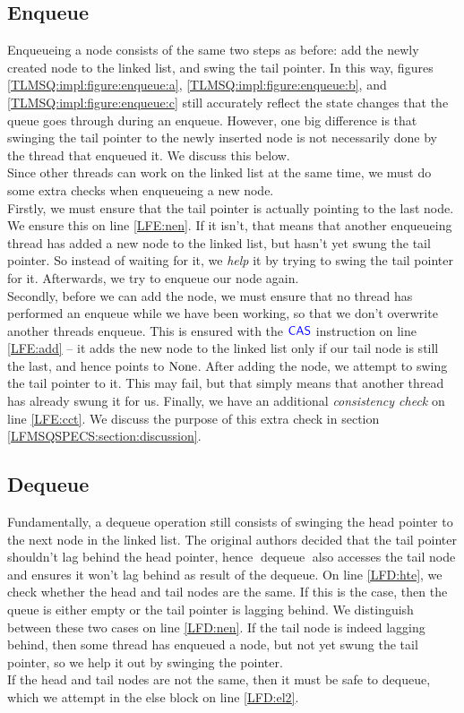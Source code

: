 \documentclass[a4paper, 10pt]{report}
\theoremstyle{definition}
\newcommand{\dequeue}{\operatorname{dequeue}}
\begin{document}
\subsection{Enqueue}
Enqueueing a node consists of the same two steps as before: add the newly created node to the linked list, and swing the tail pointer. In this way, figures \ref{TLMSQ:impl:figure:enqueue:a}, \ref{TLMSQ:impl:figure:enqueue:b}, and \ref{TLMSQ:impl:figure:enqueue:c} still accurately reflect the state changes that the queue goes through during an enqueue. However, one big difference is that swinging the tail pointer to the newly inserted node is not necessarily done by the thread that enqueued it. We discuss this below.\\
Since other threads can work on the linked list at the same time, we must do some extra checks when enqueueing a new node.\\
Firstly, we must ensure that the tail pointer is actually pointing to the last node. We ensure this on line \ref{LFE:nen}. If it isn't, that means that another enqueueing thread has added a new node to the linked list, but hasn't yet swung the tail pointer. So instead of waiting for it, we \textit{help} it by trying to swing the tail pointer for it. Afterwards, we try to enqueue our node again.\\
Secondly, before we can add the node, we must ensure that no thread has performed an enqueue while we have been working, so that we don't overwrite another threads enqueue. This is ensured with the $\textsf{\color{blue} CAS}$ instruction on line \ref{LFE:add} -- it adds the new node to the linked list only if our tail node is still the last, and hence points to $\operatorname{None}$. After adding the node, we attempt to swing the tail pointer to it. This may fail, but that simply means that another thread has already swung it for us.
Finally, we have an additional \textit{consistency check} on line \ref{LFE:cct}. We discuss the purpose of this extra check in section \ref{LFMSQSPECS:section:discussion}.

\subsection{Dequeue}
Fundamentally, a dequeue operation still consists of swinging the head pointer to the next node in the linked list. The original authors decided that the tail pointer shouldn't lag behind the head pointer, hence $\dequeue$ also accesses the tail node and ensures it won't lag behind as result of the dequeue. On line \ref{LFD:hte}, we check whether the head and tail nodes are the same. If this is the case, then the queue is either empty or the tail pointer is lagging behind. We distinguish between these two cases on line \ref{LFD:nen}. If the tail node is indeed lagging behind, then some thread has enqueued a node, but not yet swung the tail pointer, so we help it out by swinging the pointer.\\
If the head and tail nodes are not the same, then it must be safe to dequeue, which we attempt in the else block on line \ref{LFD:el2}.
\end{document}
